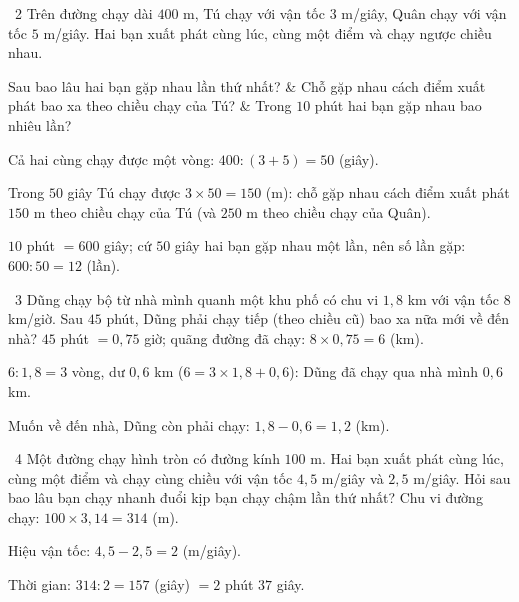 \begin{exbox}{\ExWord\ 2}
Trên đường chạy dài $400$ m, Tú chạy với vận tốc $3$ m/giây, Quân chạy với vận tốc $5$ m/giây. Hai bạn xuất phát cùng lúc, cùng một điểm và chạy ngược chiều nhau.
\begin{cols3}
 Sau bao lâu hai bạn gặp nhau lần thứ nhất? &  Chỗ gặp nhau cách điểm xuất phát bao xa theo chiều chạy của Tú? &  Trong $10$ phút hai bạn gặp nhau bao nhiêu lần?
\end{cols3}
\guide
{} Cả hai cùng chạy được một vòng: $400:(3+5)=50$ (giây).\par
{} Trong $50$ giây Tú chạy được $3\times50=150$ (m): chỗ gặp nhau cách điểm xuất phát $150$ m theo chiều chạy của Tú (và $250$ m theo chiều chạy của Quân).\par
{} $10$ phút $=600$ giây; cứ $50$ giây hai bạn gặp nhau một lần, nên số lần gặp: $600:50=12$ (lần).
\end{exbox}
\gap
\begin{exbox}{\ExWord\ 3}
Dũng chạy bộ từ nhà mình quanh một khu phố có chu vi $1{,}8$ km với vận tốc $8$ km/giờ. Sau $45$ phút, Dũng phải chạy tiếp (theo chiều cũ) bao xa nữa mới về đến nhà?
\guide
$45$ phút $=0{,}75$ giờ; quãng đường đã chạy: $8\times0{,}75=6$ (km).\par
$6:1{,}8=3$ vòng, dư $0{,}6$ km ($6=3\times1{,}8+0{,}6$): Dũng đã chạy qua nhà mình $0{,}6$ km.\par
Muốn về đến nhà, Dũng còn phải chạy: $1{,}8-0{,}6=1{,}2$ (km).
\end{exbox}
\gap
\begin{exbox}{\ExWord\ 4}
Một đường chạy hình tròn có đường kính $100$ m. Hai bạn xuất phát cùng lúc, cùng một điểm và chạy cùng chiều với vận tốc $4{,}5$ m/giây và $2{,}5$ m/giây. Hỏi sau bao lâu bạn chạy nhanh đuổi kịp bạn chạy chậm lần thứ nhất?
\guide
Chu vi đường chạy: $100\times3{,}14=314$ (m).\par
Hiệu vận tốc: $4{,}5-2{,}5=2$ (m/giây).\par
Thời gian: $314:2=157$ (giây) $=2$ phút $37$ giây.
\end{exbox}
\gap
